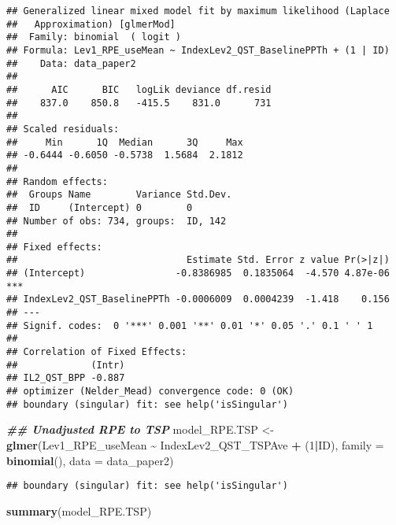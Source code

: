 \documentclass[
  12pt,
]{article}
\newenvironment{Shaded}{\begin{snugshade}}{\end{snugshade}}
\newcommand{\AttributeTok}[1]{\textcolor[rgb]{0.13,0.29,0.53}{#1}}
\newcommand{\DecValTok}[1]{\textcolor[rgb]{0.00,0.00,0.81}{#1}}
\newcommand{\DocumentationTok}[1]{\textcolor[rgb]{0.56,0.35,0.01}{\textbf{\textit{#1}}}}
\newcommand{\FunctionTok}[1]{\textcolor[rgb]{0.13,0.29,0.53}{\textbf{#1}}}
\newcommand{\NormalTok}[1]{#1}
\newcommand{\OtherTok}[1]{\textcolor[rgb]{0.56,0.35,0.01}{#1}}
\newcommand{\SpecialCharTok}[1]{\textcolor[rgb]{0.81,0.36,0.00}{\textbf{#1}}}
\begin{document}
\begin{verbatim}
## Generalized linear mixed model fit by maximum likelihood (Laplace
##   Approximation) [glmerMod]
##  Family: binomial  ( logit )
## Formula: Lev1_RPE_useMean ~ IndexLev2_QST_BaselinePPTh + (1 | ID)
##    Data: data_paper2
## 
##      AIC      BIC   logLik deviance df.resid 
##    837.0    850.8   -415.5    831.0      731 
## 
## Scaled residuals: 
##     Min      1Q  Median      3Q     Max 
## -0.6444 -0.6050 -0.5738  1.5684  2.1812 
## 
## Random effects:
##  Groups Name        Variance Std.Dev.
##  ID     (Intercept) 0        0       
## Number of obs: 734, groups:  ID, 142
## 
## Fixed effects:
##                              Estimate Std. Error z value Pr(>|z|)    
## (Intercept)                -0.8386985  0.1835064  -4.570 4.87e-06 ***
## IndexLev2_QST_BaselinePPTh -0.0006009  0.0004239  -1.418    0.156    
## ---
## Signif. codes:  0 '***' 0.001 '**' 0.01 '*' 0.05 '.' 0.1 ' ' 1
## 
## Correlation of Fixed Effects:
##             (Intr)
## IL2_QST_BPP -0.887
## optimizer (Nelder_Mead) convergence code: 0 (OK)
## boundary (singular) fit: see help('isSingular')
\end{verbatim}

\begin{Shaded}
\begin{Highlighting}[]
\DocumentationTok{\#\# Unadjusted RPE to TSP}
\NormalTok{model\_RPE.TSP }\OtherTok{\textless{}{-}} \FunctionTok{glmer}\NormalTok{(Lev1\_RPE\_useMean }\SpecialCharTok{\textasciitilde{}}\NormalTok{ IndexLev2\_QST\_TSPAve }\SpecialCharTok{+}\NormalTok{ (}\DecValTok{1}\SpecialCharTok{|}\NormalTok{ID), }\AttributeTok{family =} \FunctionTok{binomial}\NormalTok{(), }\AttributeTok{data =}\NormalTok{ data\_paper2)}
\end{Highlighting}
\end{Shaded}

\begin{verbatim}
## boundary (singular) fit: see help('isSingular')
\end{verbatim}

\begin{Shaded}
\begin{Highlighting}[]
\FunctionTok{summary}\NormalTok{(model\_RPE.TSP)}
\end{Highlighting}
\end{Shaded}
\end{document}
